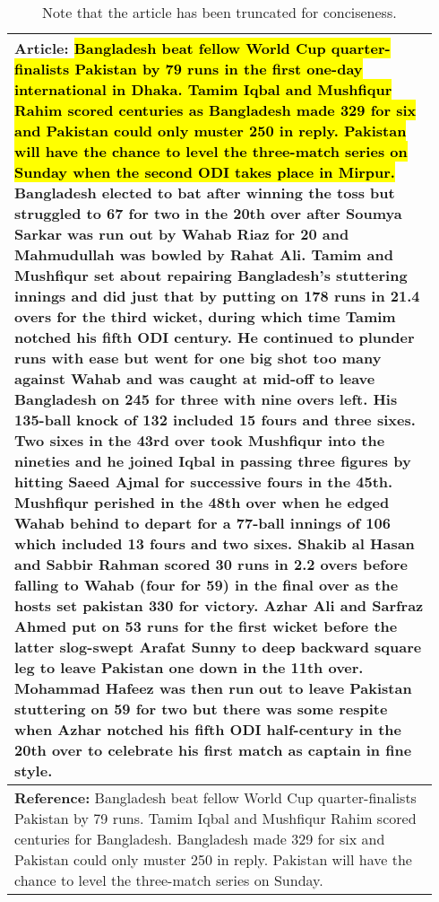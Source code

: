 \begin{table}[t]
    \centering
    \small
    \begin{tabular}{|p{0.94\linewidth}|}
        \hline
        \textbf{Article:} \hl{Bangladesh beat fellow World Cup quarter-finalists Pakistan by 79 runs in the first one-day international in Dhaka. Tamim Iqbal and Mushfiqur Rahim scored centuries as Bangladesh made 329 for six and Pakistan could only muster 250 in reply. Pakistan will have the chance to level the three-match series on Sunday when the second ODI takes place in Mirpur.} Bangladesh elected to bat after winning the toss but struggled to 67 for two in the 20th over after Soumya Sarkar was run out by Wahab Riaz for 20 and Mahmudullah was bowled by Rahat Ali. Tamim and Mushfiqur set about repairing Bangladesh's stuttering innings and did just that by putting on 178 runs in 21.4 overs for the third wicket, during which time Tamim notched his fifth ODI century. He continued to plunder runs with ease but went for one big shot too many against Wahab and was caught at mid-off to leave Bangladesh on 245 for three with nine overs left. His 135-ball knock of 132 included 15 fours and three sixes. Two sixes in the 43rd over took Mushfiqur into the nineties and he joined Iqbal in passing three figures by hitting Saeed Ajmal for successive fours in the 45th. Mushfiqur perished in the 48th over when he edged Wahab behind to depart for a 77-ball innings of 106 which included 13 fours and two sixes. Shakib al Hasan and Sabbir Rahman scored 30 runs in 2.2 overs before falling to Wahab (four for 59) in the final over as the hosts set pakistan 330 for victory. Azhar Ali and Sarfraz Ahmed put on 53 runs for the first wicket before the latter slog-swept Arafat Sunny to deep backward square leg to leave Pakistan one down in the 11th over. Mohammad Hafeez was then run out to leave Pakistan stuttering on 59 for two but there was some respite when Azhar notched his fifth ODI half-century in the 20th over to celebrate his first match as captain in fine style.\\ \hline
        \textbf{Reference:} Bangladesh beat fellow World Cup quarter-finalists Pakistan by 79 runs. Tamim Iqbal and Mushfiqur Rahim scored centuries for Bangladesh. Bangladesh made 329 for six and Pakistan could only muster 250 in reply. Pakistan will have the chance to level the three-match series on Sunday. \\
        \hline
    \end{tabular}
    \caption{Note that the article has been truncated for conciseness.}
    \label{tab:lead_ex}
\end{table}


